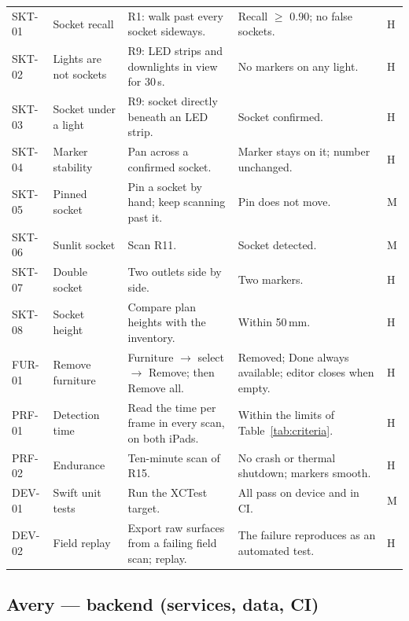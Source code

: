 \documentclass[conference,a4paper,10pt]{IEEEtran}
\begin{document}
\begin{longtable}{@{}L{1.25cm}L{3.6cm}L{5.4cm}L{5.1cm}C{0.4cm}@{}}
SKT-01 & Socket recall & R1: walk past every socket sideways. & Recall $\ge$ 0.90; no false sockets. & H \\
SKT-02 & Lights are not sockets & R9: LED strips and downlights in view for 30\,s. & No markers on any light. & H \\
SKT-03 & Socket under a light & R9: socket directly beneath an LED strip. & Socket confirmed. & H \\
SKT-04 & Marker stability & Pan across a confirmed socket. & Marker stays on it; number unchanged. & H \\
SKT-05 & Pinned socket & Pin a socket by hand; keep scanning past it. & Pin does not move. & M \\
SKT-06 & Sunlit socket & Scan R11. & Socket detected. & M \\
SKT-07 & Double socket & Two outlets side by side. & Two markers. & H \\
SKT-08 & Socket height & Compare plan heights with the inventory. & Within 50\,mm. & H \\
FUR-01 & Remove furniture & Furniture $\rightarrow$ select $\rightarrow$ Remove; then Remove all. & Removed; Done always available; editor closes when empty. & H \\
PRF-01 & Detection time & Read the time per frame in every scan, on both iPads. & Within the limits of Table~\ref{tab:criteria}. & H \\
PRF-02 & Endurance & Ten-minute scan of R15. & No crash or thermal shutdown; markers smooth. & H \\
DEV-01 & Swift unit tests & Run the XCTest target. & All pass on device and in CI. & M \\
DEV-02 & Field replay & Export raw surfaces from a failing field scan; replay. & The failure reproduces as an automated test. & H \\
\end{longtable}

\subsection{Avery --- backend (services, data, CI)}\label{app:avery}
\end{document}
